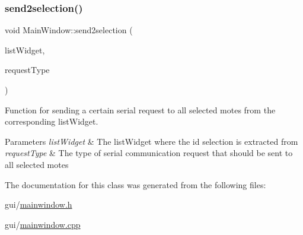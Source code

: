 \subsubsection{\texorpdfstring{send2selection()}{send2selection()}}
{\footnotesize\ttfamily void Main\+Window\+::send2selection (\begin{DoxyParamCaption}\item[{Q\+List\+Widget $\ast$}]{list\+Widget,  }\item[{Q\+String}]{request\+Type }\end{DoxyParamCaption})\hspace{0.3cm}{\ttfamily [protected]}}



Function for sending a certain serial request to all selected motes from the corresponding list\+Widget. 


\begin{DoxyParams}{Parameters}
{\em list\+Widget} & The list\+Widget where the id selection is extracted from \\
\hline
{\em request\+Type} & The type of serial communication request that should be sent to all selected motes \\
\hline
\end{DoxyParams}


The documentation for this class was generated from the following files\+:\begin{DoxyCompactItemize}
\item 
gui/\hyperlink{mainwindow_8h}{mainwindow.\+h}\item 
gui/\hyperlink{mainwindow_8cpp}{mainwindow.\+cpp}\end{DoxyCompactItemize}
